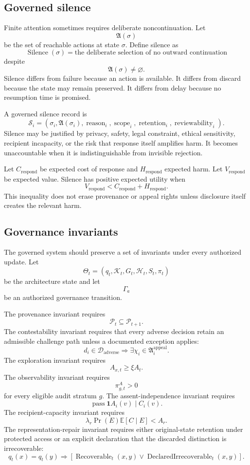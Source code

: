 \documentclass[11pt]{article}
\theoremstyle{definition}
\DeclareMathOperator{\Prob}{Pr}
\newcommand{\E}{\mathbb{E}}
\newcommand{\K}{\mathcal{K}}
\newcommand{\ind}{\mathbf{1}}
\begin{document}
\subsection{Governed silence}

Finite attention sometimes requires deliberate noncontinuation. Let
\[
\mathfrak{A}(\sigma)
\]
be the set of reachable actions at state \(\sigma\). Define silence as
\[
\operatorname{Silence}(\sigma)
=
\text{the deliberate selection of no outward continuation}
\]
despite
\[
\mathfrak{A}(\sigma)\neq\varnothing.
\]
Silence differs from failure because an action is available. It differs from discard because the state may remain preserved. It differs from delay because no resumption time is promised.

A governed silence record is
\[
\mathcal{S}_i
=
\left(
\sigma_i,
\mathfrak{A}(\sigma_i),
\operatorname{reason}_i,
\operatorname{scope}_i,
\operatorname{retention}_i,
\operatorname{reviewability}_i
\right).
\]
Silence may be justified by privacy, safety, legal constraint, ethical sensitivity, recipient incapacity, or the risk that response itself amplifies harm. It becomes unaccountable when it is indistinguishable from invisible rejection.

Let \(C_{\mathrm{respond}}\) be expected cost of response and \(H_{\mathrm{respond}}\) expected harm. Let \(V_{\mathrm{respond}}\) be expected value. Silence has positive expected utility when
\[
V_{\mathrm{respond}}
<
C_{\mathrm{respond}}
+
H_{\mathrm{respond}}.
\]
This inequality does not erase provenance or appeal rights unless disclosure itself creates the relevant harm.

\subsection{Governance invariants}

The governed system should preserve a set of invariants under every authorized update. Let
\[
\Theta_t
=
(q_t,\K_t,G_t,\mathcal{H}_t,S_t,\pi_t)
\]
be the architecture state and let
\[
\Gamma_a
\]
be an authorized governance transition.

The provenance invariant requires
\[
\mathcal{P}_t
\subseteq
\mathcal{P}_{t+1}.
\]
The contestability invariant requires that every adverse decision retain an admissible challenge path unless a documented exception applies:
\[
d_i\in\mathcal{D}_{\mathrm{adverse}}
\Longrightarrow
\exists\chi_i\in\mathfrak{A}_i^{\mathrm{appeal}}.
\]
The exploration invariant requires
\[
A_{x,t}\geq\xi A_t.
\]
The observability invariant requires
\[
\pi_{g,t}^{A}>0
\]
for every eligible audit stratum \(g\). The assent-independence invariant requires
\[
\operatorname{pass}\ind A_i(v)\mid C_i(v).
\]
The recipient-capacity invariant requires
\[
\lambda_r\Prob(E)\E[C\mid E]<A_r.
\]
The representation-repair invariant requires either original-state retention under protected access or an explicit declaration that the discarded distinction is irrecoverable:
\[
q_t(x)=q_t(y)
\Longrightarrow
\left[
\operatorname{Recoverable}_t(x,y)
\lor
\operatorname{DeclaredIrrecoverable}_t(x,y)
\right].
\]
\end{document}
